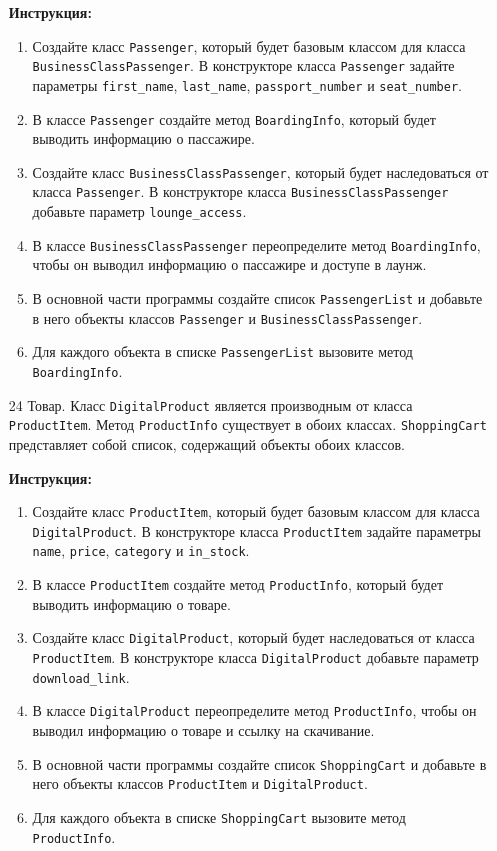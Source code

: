 \begin{enumerate}
\textbf{Инструкция:}
\begin{enumerate}
    \item Создайте класс \texttt{Passenger}, который будет базовым классом для класса \texttt{BusinessClassPassenger}. В конструкторе класса \texttt{Passenger} задайте параметры \texttt{first\_name}, \texttt{last\_name}, \texttt{passport\_number} и \texttt{seat\_number}.
    \item В классе \texttt{Passenger} создайте метод \texttt{BoardingInfo}, который будет выводить информацию о пассажире.
    \item Создайте класс \texttt{BusinessClassPassenger}, который будет наследоваться от класса \texttt{Passenger}. В конструкторе класса \texttt{BusinessClassPassenger} добавьте параметр \texttt{lounge\_access}.
    \item В классе \texttt{BusinessClassPassenger} переопределите метод \texttt{BoardingInfo}, чтобы он выводил информацию о пассажире и доступе в лаунж.
    \item В основной части программы создайте список \texttt{PassengerList} и добавьте в него объекты классов \texttt{Passenger} и \texttt{BusinessClassPassenger}.
    \item Для каждого объекта в списке \texttt{PassengerList} вызовите метод \texttt{BoardingInfo}.
\end{enumerate}

\item[24]
Товар. Класс \texttt{DigitalProduct} является производным от класса \texttt{ProductItem}. Метод \texttt{ProductInfo} существует в обоих классах. \texttt{ShoppingCart} представляет собой список, содержащий объекты обоих классов.

\textbf{Инструкция:}
\begin{enumerate}
    \item Создайте класс \texttt{ProductItem}, который будет базовым классом для класса \texttt{DigitalProduct}. В конструкторе класса \texttt{ProductItem} задайте параметры \texttt{name}, \texttt{price}, \texttt{category} и \texttt{in\_stock}.
    \item В классе \texttt{ProductItem} создайте метод \texttt{ProductInfo}, который будет выводить информацию о товаре.
    \item Создайте класс \texttt{DigitalProduct}, который будет наследоваться от класса \texttt{ProductItem}. В конструкторе класса \texttt{DigitalProduct} добавьте параметр \texttt{download\_link}.
    \item В классе \texttt{DigitalProduct} переопределите метод \texttt{ProductInfo}, чтобы он выводил информацию о товаре и ссылку на скачивание.
    \item В основной части программы создайте список \texttt{ShoppingCart} и добавьте в него объекты классов \texttt{ProductItem} и \texttt{DigitalProduct}.
    \item Для каждого объекта в списке \texttt{ShoppingCart} вызовите метод \texttt{ProductInfo}.
\end{enumerate}


\end{enumerate}
